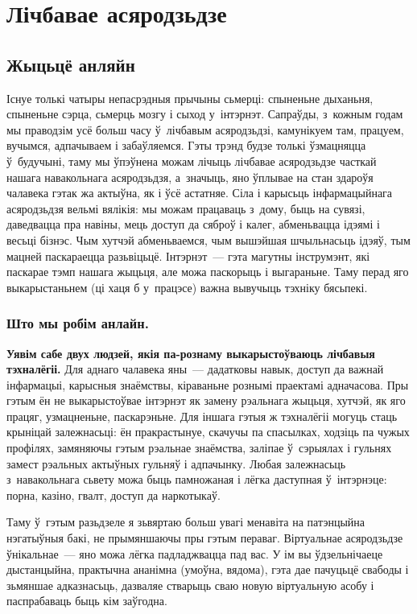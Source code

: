 \chapter{Лічбавае асяродзьдзе}

\section{Жыцьцё анляйн}

Існуе толькі чатыры непасрэдныя прычыны сьмерці: спыненьне дыханьня, спыненьне сэрца, сьмерць мозгу і сыход у~інтэрнэт. Сапраўды, з~кожным годам мы праводзім усё больш часу ў~лічбавым асяродзьдзі, камунікуем там, працуем, вучымся, адпачываем і забаўляемся. Гэты трэнд будзе толькі ўзмацняцца ў~будучыні, таму мы ўпэўнена можам лічыць лічбавае асяродзьдзе часткай нашага навакольнага асяродзьдзя, а~значыць, яно ўплывае на стан здароўя чалавека гэтак жа актыўна, як і ўсё астатняе. Сіла і карысьць інфармацыйнага асяродзьдзя вельмі вялікія: мы можам працаваць з~дому, быць на сувязі, даведвацца пра навіны, мець доступ да сяброў і калег, абменьвацца ідэямі і весьці бізнэс. Чым хутчэй абменьваемся, чым вышэйшая шчыльнасьць ідэяў, тым мацней паскараецца разьвіцьцё. Інтэрнэт~--- гэта магутны інструмэнт, які паскарае тэмп нашага жыцьця, але можа паскорыць і выгараньне. Таму перад яго выкарыстаньнем (ці хаця б у~працэсе) важна вывучыць тэхніку бясьпекі.

\subsection*{Што мы робім анлайн.}

\textbf{Уявім сабе двух людзей, якія па-рознаму выкарыстоўваюць лічбавыя тэхналёгіі.} Для аднаго чалавека яны~--- дадатковы навык, доступ да важнай інфармацыі, карысныя знаёмствы, кіраваньне рознымі праектамі адначасова. Пры гэтым ён не выкарыстоўвае інтэрнэт як замену рэальнага жыцьця, хутчэй, як яго працяг, узмацненьне, паскарэньне. Для іншага гэтыя ж тэхналёгіі могуць стаць крыніцай залежнасьці: ён пракрастынуе, скачучы па спасылках, ходзіць па чужых профілях, замяняючы гэтым рэальнае знаёмства, заліпае ў~сэрыялах і гульнях замест рэальных актыўных гульняў і адпачынку. Любая залежнасьць з~навакольнага сьвету можа быць памножаная і лёгка даступная ў~інтэрнэце: порна, казіно, гвалт, доступ да наркотыкаў.

Таму ў~гэтым разьдзеле я зьвяртаю больш увагі менавіта на патэнцыйна нэгатыўныя бакі, не прымяншаючы пры гэтым пераваг. Віртуальнае асяродзьдзе ўнікальнае~--- яно можа лёгка падладжвацца пад вас. У ім вы ўдзельнічаеце дыстанцыйна, практычна ананімна (умоўна, вядома), гэта дае пачуцьцё свабоды і зьмяншае адказнасьць, дазваляе стварыць сваю новую віртуальную асобу і паспрабаваць быць кім заўгодна.

